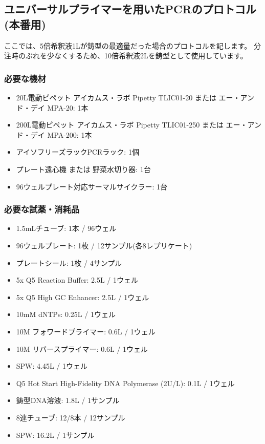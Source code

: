 \documentclass[titlepage,10pt,a4paper]{jsbook}
\begin{document}
\subsection{ユニバーサルプライマーを用いたPCRのプロトコル (本番用)}

ここでは、5倍希釈液1{\textmu}Lが鋳型の最適量だった場合のプロトコルを記します。
分注時のぶれを少なくするため、10倍希釈液2{\textmu}Lを鋳型として使用しています。

\subsubsection{必要な機材}
\begin{itemize}
\item 20{\textmu}L電動ピペット アイカムス・ラボ Pipetty TLIC01-20 または エー・アンド・デイ MPA-20: 1本
\item 200{\textmu}L電動ピペット アイカムス・ラボ Pipetty TLIC01-250 または エー・アンド・デイ MPA-200: 1本
\item アイソフリーズラックPCRラック: 1個
\item プレート遠心機 または 野菜水切り器: 1台
\item 96ウェルプレート対応サーマルサイクラー: 1台
\end{itemize}

\subsubsection{必要な試薬・消耗品}
\begin{itemize}
\item 1.5mLチューブ: 1本 / 96ウェル
\item 96ウェルプレート: 1枚 / 12サンプル(各8レプリケート)
\item プレートシール: 1枚 / 4サンプル
\item 5x Q5 Reaction Buffer: 2.5{\textmu}L / 1ウェル
\item 5x Q5 High GC Enhancer: 2.5{\textmu}L / 1ウェル
\item 10mM dNTPs: 0.25{\textmu}L / 1ウェル
\item 10{\textmu}M フォワードプライマー: 0.6{\textmu}L / 1ウェル
\item 10{\textmu}M リバースプライマー: 0.6{\textmu}L / 1ウェル
\item SPW: 4.45{\textmu}L / 1ウェル
\item Q5 Hot Start High-Fidelity DNA Polymerase (2U/{\textmu}L): 0.1{\textmu}L / 1ウェル
\item 鋳型DNA溶液: 1.8{\textmu}L / 1サンプル
\item 8連チューブ: 12/8本 / 12サンプル
\item SPW: 16.2{\textmu}L / 1サンプル
\end{itemize}
\end{document}
